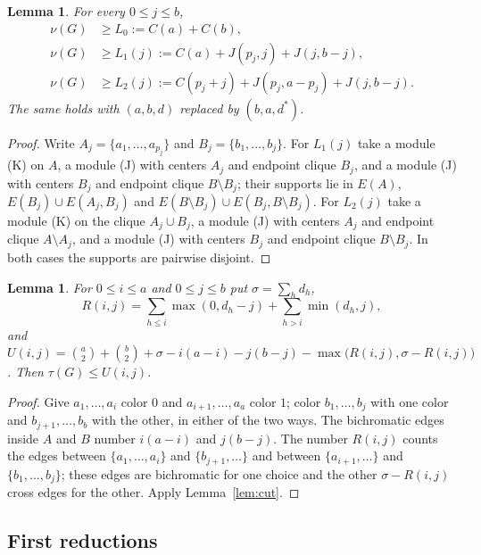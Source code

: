 \documentclass{amsart}
\newtheorem{lemma}[theorem]{Lemma}
\theoremstyle{definition}
\theoremstyle{remark}
\numberwithin{equation}{section}
\numberwithin{table}{section}
\begin{document}
\begin{lemma}\label{lem:prefix}
For every $0\le j\le b$,
\begin{align*}
\nu(G)&\ge L_0:=C(a)+C(b),\\
\nu(G)&\ge L_1(j):=C(a)+J(p_j,j)+J(j,b-j),\\
\nu(G)&\ge L_2(j):=C(p_j+j)+J(p_j,a-p_j)+J(j,b-j).
\end{align*}
The same holds with $(a,b,d)$ replaced by $(b,a,d^*)$.
\end{lemma}

\begin{proof}
Write $A_j=\{a_1,\dots,a_{p_j}\}$ and $B_j=\{b_1,\dots,b_j\}$. For $L_1(j)$ take a module (K) on $A$, a module (J) with centers $A_j$ and endpoint clique $B_j$, and a module (J) with centers $B_j$ and endpoint clique $B\setminus B_j$; their supports lie in $E(A)$, $E(B_j)\cup E(A_j,B_j)$ and $E(B\setminus B_j)\cup E(B_j,B\setminus B_j)$. For $L_2(j)$ take a module (K) on the clique $A_j\cup B_j$, a module (J) with centers $A_j$ and endpoint clique $A\setminus A_j$, and a module (J) with centers $B_j$ and endpoint clique $B\setminus B_j$. In both cases the supports are pairwise disjoint.
\end{proof}

\begin{lemma}\label{lem:orderedcut}
For $0\le i\le a$ and $0\le j\le b$ put $\sigma=\sum_hd_h$,
\[
R(i,j)=\sum_{h\le i}\max(0,d_h-j)+\sum_{h>i}\min(d_h,j),
\]
and $U(i,j)=\binom a2+\binom b2+\sigma-i(a-i)-j(b-j)-\max\bigl(R(i,j),\sigma-R(i,j)\bigr)$. Then $\tau(G)\le U(i,j)$.
\end{lemma}

\begin{proof}
Give $a_1,\dots,a_i$ color $0$ and $a_{i+1},\dots,a_a$ color $1$; color $b_1,\dots,b_j$ with one color and $b_{j+1},\dots,b_b$ with the other, in either of the two ways. The bichromatic edges inside $A$ and $B$ number $i(a-i)$ and $j(b-j)$. The number $R(i,j)$ counts the edges between $\{a_1,\dots,a_i\}$ and $\{b_{j+1},\dots\}$ and between $\{a_{i+1},\dots\}$ and $\{b_1,\dots,b_j\}$; these edges are bichromatic for one choice and the other $\sigma-R(i,j)$ cross edges for the other. Apply Lemma~\ref{lem:cut}.
\end{proof}


\subsection{First reductions}
\end{document}

